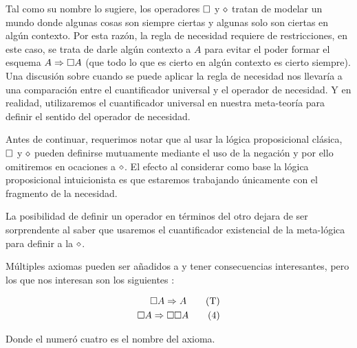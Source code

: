 Tal como su nombre lo sugiere, los operadores $\square$ y $\diamond$ tratan de modelar un mundo donde algunas cosas son siempre ciertas y algunas solo son ciertas en algún contexto. Por esta razón, la regla de necesidad requiere de restricciones, en este caso, se trata de darle algún contexto a $A$ para evitar el poder formar el esquema $A \Rightarrow \square A$ (que todo lo que es cierto en algún contexto es cierto siempre). Una discusión sobre cuando se puede aplicar la regla de necesidad nos llevaría a una comparación entre el cuantificador universal y el operador de necesidad. Y en realidad, utilizaremos el cuantificador universal en nuestra meta-teoría para definir el sentido del operador de necesidad.

Antes de continuar, requerimos notar que al usar la lógica proposicional clásica, $\square$ y $\diamond$ pueden definirse mutuamente mediante el uso de la negación y por ello omitiremos en ocaciones a $\diamond$. El efecto al considerar como base la lógica proposicional intuicionista es que estaremos trabajando únicamente con el fragmento de la necesidad.

La posibilidad de definir un operador en términos del otro dejara de ser sorprendente al saber que usaremos el cuantificador existencial de la meta-lógica para definir a la $\diamond$.


Múltiples axiomas pueden ser añadidos a \K y tener consecuencias interesantes, pero los que nos interesan son los siguientes :


\begin{align}
  \square A \Rightarrow A \label{eqn:taxiom} \tag{T} \\
  \square A \Rightarrow \square \square A \label{eqn:4axiom}\tag{4}
\end{align}

Donde el numeró cuatro es el nombre del axioma.


